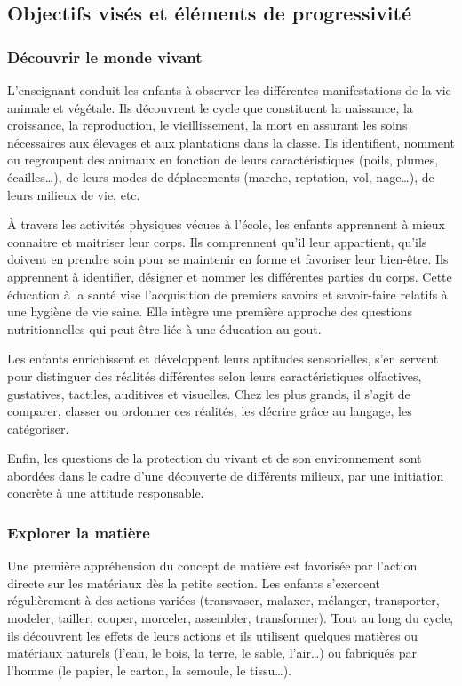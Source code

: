\subsection{Objectifs visés et éléments de progressivité}
\subsubsection{Découvrir le monde vivant}
L’enseignant conduit les enfants à observer les différentes manifestations de la vie animale et végétale. Ils découvrent le cycle que constituent la naissance, la croissance, la reproduction, le vieillissement, la mort en assurant les soins nécessaires aux élevages et aux plantations dans la classe. Ils identifient, nomment ou regroupent des animaux en fonction de leurs caractéristiques (poils, plumes, écailles\dots), de leurs modes de déplacements (marche, reptation, vol, nage\dots), de leurs milieux de vie, etc.

À travers les activités physiques vécues à l’école, les enfants apprennent à mieux connaitre et maitriser leur corps. Ils comprennent qu’il leur appartient, qu’ils doivent en prendre soin pour se maintenir en forme et favoriser leur bien-être. Ils apprennent à identifier, désigner et nommer les différentes parties du corps. Cette éducation à la santé vise l’acquisition de premiers savoirs et savoir-faire relatifs à une hygiène de vie saine. Elle intègre une première approche des questions nutritionnelles qui peut être liée à une éducation au gout.

Les enfants enrichissent et développent leurs aptitudes sensorielles, s'en servent pour distinguer des réalités différentes selon leurs caractéristiques olfactives, gustatives, tactiles, auditives et visuelles. Chez les plus grands, il s’agit de comparer, classer ou ordonner ces réalités, les décrire grâce au langage, les catégoriser.

Enfin, les questions de la protection du vivant et de son environnement sont abordées dans le cadre d’une découverte de différents milieux, par une initiation concrète à une attitude responsable.

\subsubsection{Explorer la matière}
Une première appréhension du concept de matière est favorisée par l’action directe sur les matériaux dès la petite section. Les enfants s'exercent régulièrement à des actions variées (transvaser, malaxer, mélanger, transporter, modeler, tailler, couper, morceler, assembler, transformer). Tout au long du cycle, ils découvrent les effets de leurs actions et ils utilisent quelques matières ou matériaux naturels (l’eau, le bois, la terre, le sable, l’air\dots) ou fabriqués par l’homme (le papier, le carton, la semoule, le tissu\dots).

